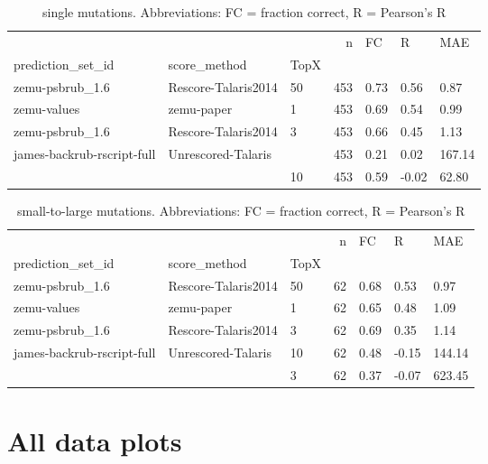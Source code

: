\documentclass[10pt, letterpaper, oneside, titlepage, landscape]{scrreprt}
\begin{document}
\begin{table}[H]
\begin{tabular}{lllrlll}
\toprule
                           &                     &    &    n &    FC &      R &     MAE \\
prediction\_set\_id & score\_method & TopX &      &       &        &         \\
\midrule
zemu-psbrub\_1.6 & Rescore-Talaris2014 & 50 &  453 &  0.73 &   0.56 &    0.87 \\
zemu-values & zemu-paper & 1  &  453 &  0.69 &   0.54 &    0.99 \\
zemu-psbrub\_1.6 & Rescore-Talaris2014 & 3  &  453 &  0.66 &   0.45 &    1.13 \\
james-backrub-rscript-full & Unrescored-Talaris &    &  453 &  0.21 &   0.02 &  167.14 \\
                           &                     & 10 &  453 &  0.59 &  -0.02 &   62.80 \\
\bottomrule
\end{tabular}
\caption{single mutations. Abbreviations: FC = fraction correct, R = Pearson's R}
\end{table}
\begin{table}[H]
\begin{tabular}{lllrlll}
\toprule
                           &                     &    &   n &    FC &      R &     MAE \\
prediction\_set\_id & score\_method & TopX &     &       &        &         \\
\midrule
zemu-psbrub\_1.6 & Rescore-Talaris2014 & 50 &  62 &  0.68 &   0.53 &    0.97 \\
zemu-values & zemu-paper & 1  &  62 &  0.65 &   0.48 &    1.09 \\
zemu-psbrub\_1.6 & Rescore-Talaris2014 & 3  &  62 &  0.69 &   0.35 &    1.14 \\
james-backrub-rscript-full & Unrescored-Talaris & 10 &  62 &  0.48 &  -0.15 &  144.14 \\
                           &                     & 3  &  62 &  0.37 &  -0.07 &  623.45 \\
\bottomrule
\end{tabular}
\caption{small-to-large mutations. Abbreviations: FC = fraction correct, R = Pearson's R}
\end{table}

\clearpage

\section{All data plots}
\end{document}
